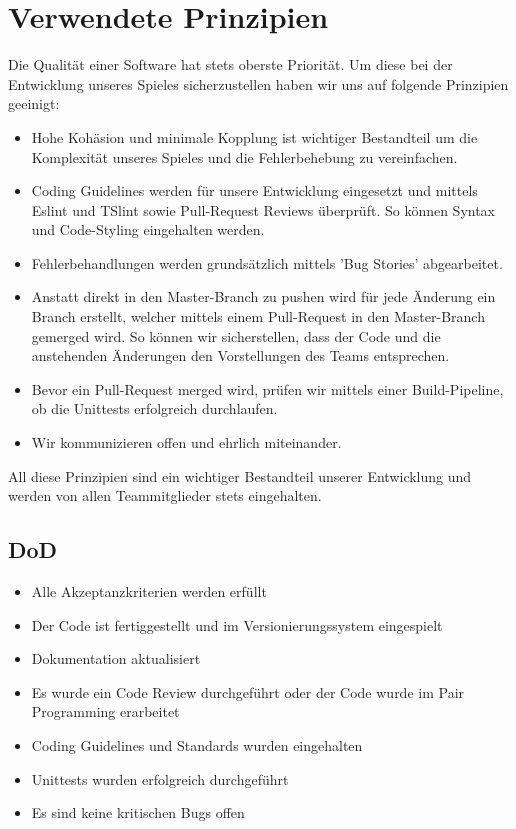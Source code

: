 \documentclass[a4paper, 11pt]{scrartcl}
\let\oldsection\section
\renewcommand\section{\clearpage\oldsection}
\begin{document}
\section{Verwendete Prinzipien}
Die Qualität einer Software hat stets oberste Priorität. Um diese bei der Entwicklung unseres Spieles
sicherzustellen haben wir uns auf folgende Prinzipien geeinigt:
\begin{itemize}
\item Hohe Kohäsion und minimale Kopplung ist wichtiger Bestandteil um die Komplexität unseres
 Spieles und die Fehlerbehebung zu vereinfachen.
\item Coding Guidelines werden für unsere Entwicklung eingesetzt und mittels Eslint und TSlint sowie Pull-Request Reviews überprüft. So können Syntax und Code-Styling eingehalten werden.
\item Fehlerbehandlungen werden grundsätzlich mittels 'Bug Stories' abgearbeitet.
\item Anstatt direkt in den Master-Branch zu pushen wird für jede Änderung ein Branch erstellt, welcher mittels einem Pull-Request in den Master-Branch gemerged wird. So können wir sicherstellen, dass der Code und die anstehenden Änderungen den Vorstellungen des Teams entsprechen.
\item Bevor ein Pull-Request merged wird, prüfen wir mittels einer Build-Pipeline, ob die Unittests erfolgreich durchlaufen.
\item Wir kommunizieren offen und ehrlich miteinander. 
\end{itemize}
All diese Prinzipien sind ein wichtiger Bestandteil unserer Entwicklung und werden von allen Teammitglieder stets eingehalten.
\subsection{DoD}
\begin{itemize}
\item Alle Akzeptanzkriterien werden erfüllt
\item Der Code ist fertiggestellt und im Versionierungssystem eingespielt
\item Dokumentation aktualisiert
\item Es wurde ein Code Review durchgeführt oder der Code wurde im Pair Programming erarbeitet
\item Coding Guidelines und Standards wurden eingehalten
\item Unittests wurden erfolgreich durchgeführt
\item Es sind keine kritischen Bugs offen
\end{itemize}
\end{document}
